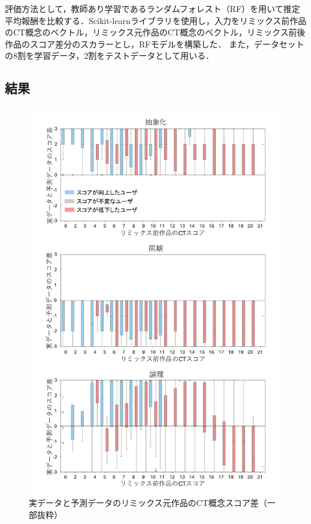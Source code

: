 \documentclass[submit,techrep,noauthor]{ipsj}
\begin{document}
評価方法として，教師あり学習であるランダムフォレスト（RF）を用いて推定平均報酬を比較する．Scikit-learnライブラリを使用し，入力をリミックス前作品のCT概念のベクトル，リミックス元作品のCT概念のベクトル，リミックス前後作品のスコア差分のスカラーとし，RFモデルを構築した．
また，データセットの8割を学習データ，2割をテストデータとして用いる．

\subsection{結果}

\begin{figure}[h]
  \centering
  \includegraphics[width=\linewidth]{@IPSJ_SIGSE202511_Horio/fig/diffmini.pdf}
  \caption{実データと予測データのリミックス元作品のCT概念スコア差（一部抜粋）}
  \label{diffminigraph}
\end{figure}
\end{document}
